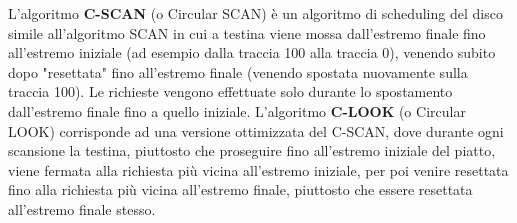 \documentclass{article}
\begin{document}
L'algoritmo \textbf{C-SCAN} (o Circular SCAN) è un algoritmo di scheduling del disco simile all'algoritmo SCAN in cui a testina viene mossa dall'estremo finale fino all'estremo iniziale (ad esempio dalla traccia 100 alla traccia 0), venendo subito dopo "resettata" fino all'estremo finale (venendo spostata nuovamente sulla traccia 100). Le richieste vengono effettuate solo durante lo spostamento dall'estremo finale fino a quello iniziale.
L'algoritmo \textbf{C-LOOK} (o Circular LOOK) corrisponde ad una versione ottimizzata del C-SCAN, dove durante ogni scansione la testina, piuttosto che proseguire fino all'estremo iniziale del piatto, viene fermata alla richiesta più vicina all'estremo iniziale, per poi venire resettata fino alla richiesta più vicina all'estremo finale, piuttosto che essere resettata all'estremo finale stesso.
\end{document}
